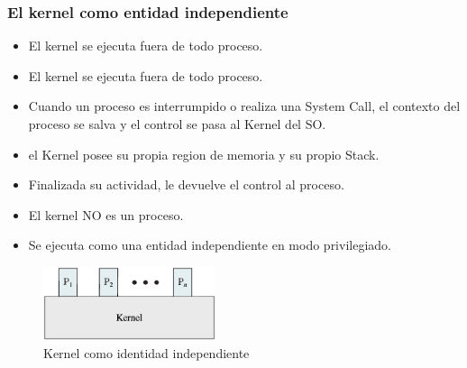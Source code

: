 \subsubsection{El kernel como entidad independiente}
\begin{itemize}
    \item El kernel se ejecuta fuera de todo proceso.
    \item El kernel se ejecuta fuera de todo proceso.
    \item Cuando un proceso es interrumpido o realiza una System Call, el contexto del proceso se salva y el control se pasa al Kernel del SO.
    \item el Kernel posee su propia region de memoria y su propio Stack.
    \item Finalizada su actividad, le devuelve el control al proceso.
    \item El kernel NO es un proceso.
    \item Se ejecuta como una entidad independiente en modo privilegiado.
\end{itemize}
\begin{figure}[h]
    \begin{center}
        \includegraphics[width=0.45\textwidth]{assets/Kernel1.eps}
    \end{center}
    \caption{Kernel como identidad independiente}\label{fig:}
\end{figure}

\vspace{2cm}

